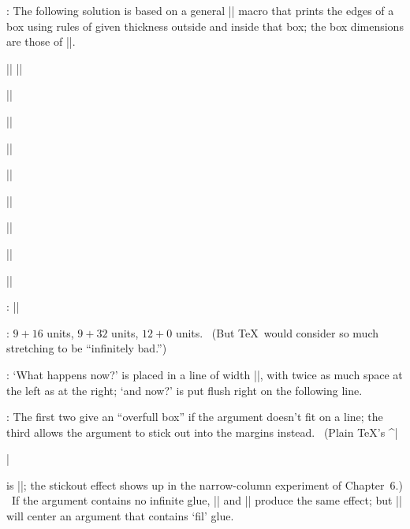 {{{:
 The following solution is based on a general |\makeblankbox|
macro that prints the edges of a box using rules of given thickness
outside and inside that box; the box dimensions are those of\/ ||.\par
|\def\dolist{\afterassignment\dodolist\let\next= }|\parbreak
|\def\dodolist{\ifx\next\endlist \let\next\relax|\parbreak
|  \else \\\let\next\dolist \fi|\parbreak
|  \next}|\par
|\def\endlist{\endlist}|\par
|\def\hidehrule#1#2{\kern-#1%
|  \hrule height#1 depth#2 \kern-#2 }|\par
|\def\hidevrule#1#2{\kern-#1{\dimen0=#1|\parbreak
|    \advance\dimen0 by#2\vrule width\dimen0}\kern-#2 }|\par
|\def\makeblankbox#1#2{\hbox{\lower\dp0\vbox{\hidehrule{#1}{#2}%
|    \kern-#1 %
|    \hbox to \wd0{\hidevrule{#1}{#2}%
|      \raise\ht0\vbox to #1{}%
|      \lower\dp0\vtop to #1{}%
|      \hfil\hidevrule{#2}{#1}}%
|    \kern-#1\hidehrule{#2}{#1}}}}|\par
|\def\maketypebox{\makeblankbox{0pt}{1pt}}|\par
|\def\makelightbox{\makeblankbox{.2pt}{.2pt}}|\par
|\def\\{\expandafter\if\space\next\|\parbreak
| \else \setbox0=\hbox{\next}\maketypebox\fi}|\par
|\def\demobox#1{\setbox0=\hbox{\dolist#1\endlist}%
|  \copy0\kern-\wd0\makelightbox}|\par

:
 |\def\frac#1/#2{\leavevmode\kern.1em|\parbreak
|\raise.5ex\hbox{\the\scriptfont0 #1}\kern-.1em|\parbreak
|/\kern-.15em\lower.25ex\hbox{\the\scriptfont0 #2}}|

:
 $9+16$ units, $9+32$ units, $12+0$ units. \ (But \TeX\ would
consider so much stretching to be ``infinitely bad.'')

:
 `What happens now?' is placed in a line of width |\hsize|, with
twice as much space at the left as at the right; `and now?' is put flush right
on the following line.

:
 The first two give an ``overfull box'' if the argument doesn't fit
on a line; the third allows the argument to stick out into the margins
instead. \ (Plain \TeX's ^|\centerline| is |\centerlinec|; the stickout effect
shows up in the narrow-column experiment of Chapter~6.) \ If the argument
contains no infinite glue, |\centerlinea| and |\centerlineb| produce the same
effect; but |\centerlineb| will center an argument that contains `fil' glue.

}}}
